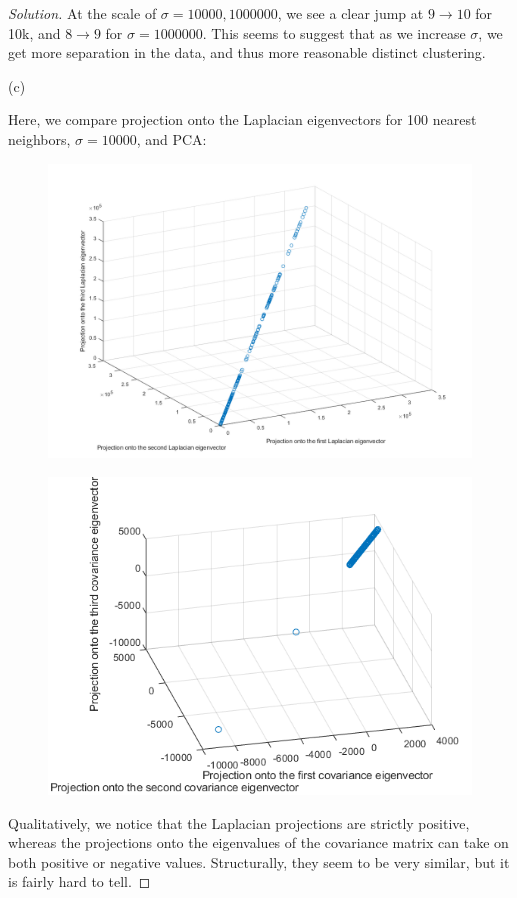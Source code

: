 \documentclass[10pt]{article}
\begin{document}
\begin{proof}[Solution]
At the scale of $\sigma = 10000, 1000000$, we see a clear jump at $9 \to 10$ for 10k, and $8 \to 9$ for $\sigma = 1000000$. This seems to suggest that as we increase $\sigma$, we get more separation in the data, and thus more reasonable distinct clustering.

(c)

Here, we compare projection onto the Laplacian eigenvectors for 100 nearest neighbors, $\sigma = 10000$, and PCA:

\begin{figure}[H]
\centering
\begin{minipage}{.5\textwidth}
  \centering
  \includegraphics[width=\linewidth]{laplacian_projection}
  \label{fig:test1}
\end{minipage}%
\begin{minipage}{.5\textwidth}
  \centering
  \includegraphics[width=\linewidth]{covariance_projection}
  \label{fig:test2}
\end{minipage}
\end{figure}

Qualitatively, we notice that the Laplacian projections are strictly positive, whereas the projections onto the eigenvalues of the covariance matrix can take on both positive or negative values. Structurally, they seem to be very similar, but it is fairly hard to tell.


\end{proof}
\end{document}
